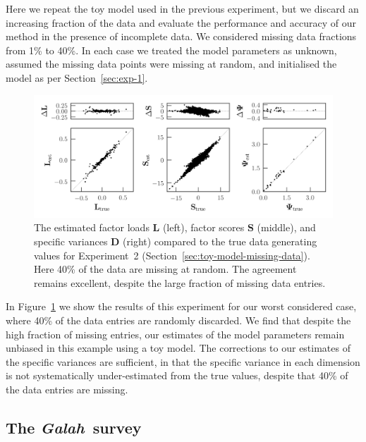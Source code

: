 \documentclass[twocolumn]{aastex62}
\newcommand{\project}[1]{\textsl{#1}}
\newcommand{\Galah}{\project{Galah}}
\newcommand{\vect}[1]{\boldsymbol{\mathbf{#1}}}
\renewcommand{\vec}[1]{\vect{#1}}
\newcommand{\factorloads}{\textbf{L}}
\newcommand{\factorscores}{\textbf{S}}
\newcommand{\specificvariance}{\vec{D}}
\begin{document}
Here we repeat the toy model used in the previous experiment, but we discard an increasing fraction
of the data and evaluate the performance and accuracy of our method in the presence
of incomplete data. We considered missing data fractions from 1\% to
40\%. In each case we treated the model parameters as unknown, assumed
the missing data points were missing at random, and initialised the
model as per Section~\ref{sec:exp-1}.

\begin{figure}[t!]
	\includegraphics[width=\textwidth]{experiments/exp-missing-data-not-at-random-inflated-40percent.png}
    \caption{The estimated factor loads $\factorloads$ (left), factor scores $\factorscores$ (middle),
    		 and specific variances $\specificvariance$ (right) compared to the 
		 	 true data generating values
		 	 for Experiment~2 (Section~\ref{sec:toy-model-missing-data}). Here 40\% of the data are missing at random.
			 The agreement remains excellent,
			 despite the large fraction of missing data entries.}
    \label{fig:exp1-missing-data}
\end{figure}


In Figure~\ref{fig:exp1-missing-data} we show the results of this
experiment for our worst considered case, where 40\% of the data
entries are randomly discarded. We find that despite the high fraction
of missing entries, our estimates of the model parameters remain unbiased
in this example using a toy model. The corrections to our estimates of the
specific variances are sufficient, in that the specific variance in each
dimension is not systematically under-estimated from the true values, 
despite that 40\% of the data entries are missing.




\subsection{The \Galah\ survey}
\label{sec:exp4}
\end{document}
